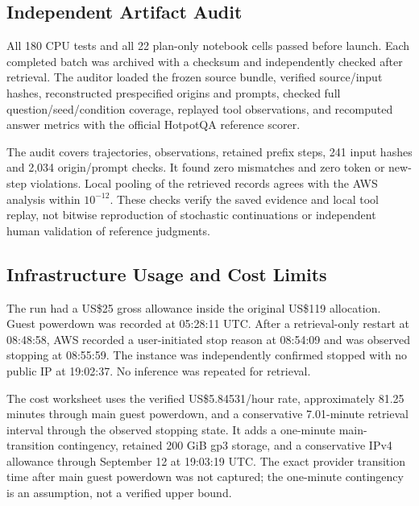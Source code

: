 \documentclass{article}
\begin{document}
\subsection{Independent Artifact Audit}
All 180 CPU tests and all 22 plan-only notebook cells passed before launch.
Each completed batch was archived with a checksum and independently checked
after retrieval. The auditor loaded the frozen source bundle, verified
source/input hashes, reconstructed prespecified origins and prompts,
checked full question/seed/condition coverage, replayed tool observations,
and recomputed answer metrics with the official HotpotQA reference scorer.

\begin{table}[h]
\centering
\caption{Completed batch coverage. Violations include replay/scoring
mismatches and generated-token/new-step allowance violations; every count is zero.}
\label{tab:main_audit}
\small

\end{table}

The audit covers \MainTrajectories{} trajectories, \MainObservations{}
observations, \MainPrefixes{} retained prefix steps, 241 input hashes and
2,034 origin/prompt checks. It found zero mismatches and zero token or
new-step violations. Local pooling of the retrieved records agrees with
the AWS analysis within $10^{-12}$. These checks verify the saved evidence
and local tool replay, not bitwise reproduction of stochastic continuations
or independent human validation of reference judgments.

\subsection{Infrastructure Usage and Cost Limits}
The run had a US\$25 gross allowance inside the original US\$119 allocation.
Guest powerdown was recorded at 05:28:11 UTC. After a retrieval-only restart
at 08:48:58, AWS recorded a user-initiated stop reason at 08:54:09 and was
observed stopping at 08:55:59. The instance was independently confirmed
stopped with no public IP at 19:02:37. No inference was repeated for retrieval.

The cost worksheet uses the verified US\$5.84531/hour rate, approximately
81.25 minutes through main guest powerdown, and a conservative 7.01-minute
retrieval interval through the observed stopping state. It adds a one-minute
main-transition contingency, retained 200 GiB gp3 storage, and a conservative
IPv4 allowance through September 12 at 19:03:19 UTC. The exact provider
transition time after main guest powerdown was not captured; the one-minute
contingency is an assumption, not a verified upper bound.
\end{document}
